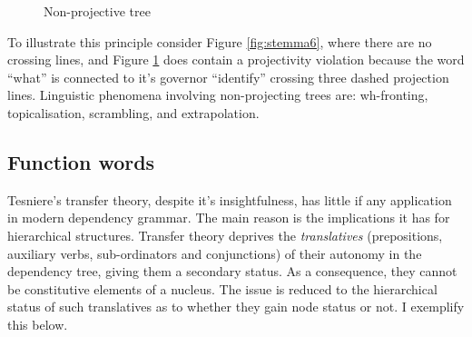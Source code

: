    \begin{figure}[!ht]
        \centering
        \caption{Non-projective tree}
        \label{fig:stemma7}
    \end{figure}

    To illustrate this principle consider Figure \ref{fig:stemma6}, where there are no crossing lines, and Figure \ref{fig:stemma7} does contain a projectivity violation because the word ``what'' is connected to it's governor ``identify'' crossing three dashed projection lines. Linguistic phenomena involving non-projecting trees are: wh-fronting, topicalisation, scrambling, and extrapolation. 

\subsection{Function words}
    Tesniere's transfer theory, despite it's insightfulness, has little if any application in modern dependency grammar. The main reason is the implications it has for hierarchical structures. Transfer theory deprives the \textit{translatives} (prepositions, auxiliary verbs, sub-ordinators and conjunctions) of their autonomy in the dependency tree, giving them a secondary status. As a consequence, they cannot be constitutive elements of a nucleus. The issue is reduced to the hierarchical status of such translatives as to whether they gain node status or not. I exemplify this below. 

